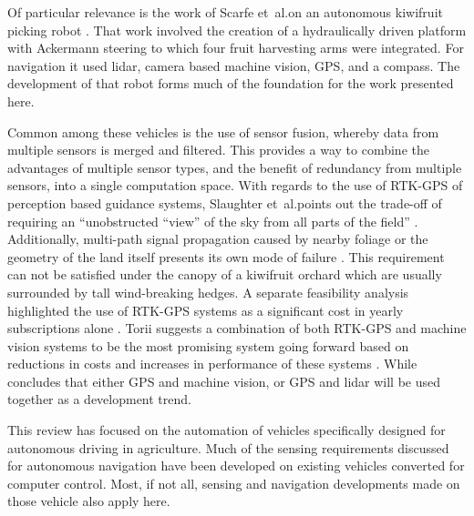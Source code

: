 \documentclass[preprint,authoryear,12pt]{elsarticle}
\begin{document}
    Of particular relevance is the work of Scarfe et~al.\@ on an autonomous kiwifruit picking robot \citep{scarfe2009, Scarfe2012}.
    That work involved the creation of a hydraulically driven platform with Ackermann steering to which four fruit harvesting arms were integrated.
    For navigation it used lidar, camera based machine vision, GPS, and a compass.
    The development of that robot forms much of the foundation for the work presented here.

    Common among these vehicles is the use of sensor fusion, whereby data from multiple sensors is merged and filtered.
    This provides a way to combine the advantages of multiple sensor types, and the benefit of redundancy from multiple sensors, into a single computation space.
    With regards to the use of RTK-GPS of perception based guidance systems, Slaughter et~al.\@ points out the trade-off of requiring an ``unobstructed ``view'' of the sky from all parts of the field'' \citep{Slaughter2008}.
    Additionally, multi-path signal propagation caused by nearby foliage or the geometry of the land itself presents its own mode of failure \citep{Durrant-Whyte2005}.
    This requirement can not be satisfied under the canopy of a kiwifruit orchard which are usually surrounded by tall wind-breaking hedges.
    A separate feasibility analysis highlighted the use of RTK-GPS systems as a significant cost in yearly subscriptions alone \citep{Pedersen2006}.
    Torii suggests a combination of both RTK-GPS and machine vision systems to be the most promising system going forward based on reductions in costs and increases in performance of these systems \cite{Torii2000}.
    While \cite{Li2009} concludes that either GPS and machine vision, or GPS and lidar will be used together as a development trend.

    This review has focused on the automation of vehicles specifically designed for autonomous driving in agriculture.
    Much of the sensing requirements discussed for autonomous navigation have been developed on existing vehicles converted for computer control.
    Most, if not all, sensing and navigation developments made on those vehicle also apply here.

\end{document}
